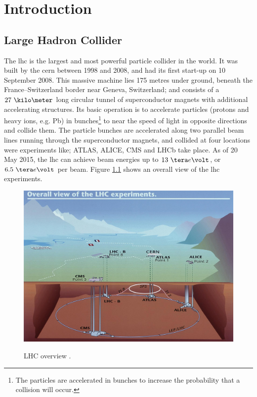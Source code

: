 \documentclass[main.tex]{subfiles}
\begin{document}
\chapter{Introduction}

\section{Large Hadron Collider}

The \gls{lhc} is the largest and most powerful particle collider in the world. It was built by the \gls{cern} \cite{cernweb} between 1998 and 2008, and had its first start-up on 10 September 2008. This massive machine lies 175 metres under ground, beneath the France–Switzerland border near Geneva, Switzerland; and consists of a $27~\kilo\meter$ long circular tunnel of superconductor magnets with additional accelerating structures. Its basic operation is to accelerate particles (protons and heavy ions, e.g. Pb) in bunches\footnote{The particles are accelerated in bunches to increase the probability that a collision will occur.} to near the speed of light in opposite directions and collide them. The particle bunches are accelerated along two parallel beam lines running through the superconductor magnets, and collided at four locations were experiments like; ATLAS\cite{atlasweb}, ALICE\cite{aliceweb}, CMS\cite{cmsweb} and LHCb\cite{lhcbweb} take place. As of 20 May 2015, the \gls{lhc} can achieve beam energies up to $13~\tera e\volt$, or $6.5~\tera e\volt$ per beam. Figure \ref{fig:lhcov} shows an overall view of the \gls{lhc} experiments.

\begin{figure} %
\includegraphics[width=0.7\linewidth]{../img/lhc.jpg}  \\[0.1 cm]
\caption{LHC overview \cite{lhcpic}.}
\label{fig:lhcov}
\end{figure}
\end{document}
